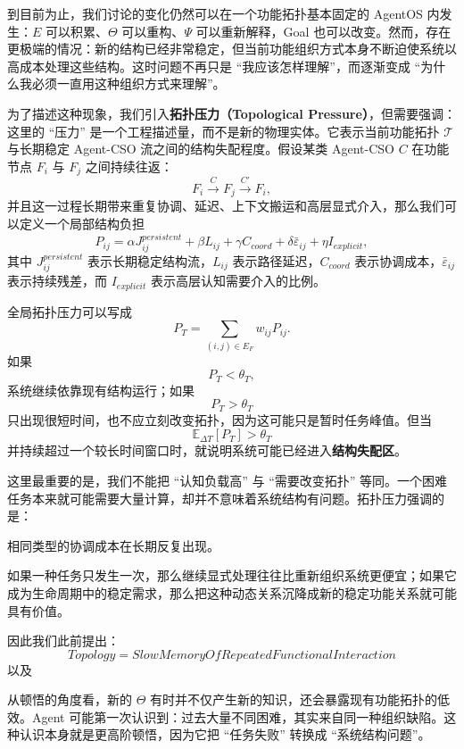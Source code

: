 到目前为止，我们讨论的变化仍然可以在一个功能拓扑基本固定的 AgentOS 内发生：$E$ 可以积累、$\Theta$ 可以重构、$\Psi$ 可以重新解释，Goal 也可以改变。然而，存在更极端的情况：新的结构已经非常稳定，但当前功能组织方式本身不断迫使系统以高成本处理这些结构。这时问题不再只是 ``我应该怎样理解''，而逐渐变成 ``为什么我必须一直用这种组织方式来理解''。

为了描述这种现象，我们引入\textbf{拓扑压力（Topological Pressure）}，但需要强调：这里的 ``压力'' 是一个工程描述量，而不是新的物理实体。它表示当前功能拓扑 $\mathcal T$ 与长期稳定 Agent-CSO 流之间的结构失配程度。假设某类 Agent-CSO $C$ 在功能节点 $F_i$ 与 $F_j$ 之间持续往返：
\[
F_i
\xrightarrow{C}
F_j
\xrightarrow{C'}
F_i,
\]
并且这一过程长期带来重复协调、延迟、上下文搬运和高层显式介入，那么我们可以定义一个局部结构负担
\[
P_{ij}
=
\alpha J_{ij}^{persistent}
+
\beta L_{ij}
+
\gamma C_{coord}
+
\delta \bar{\varepsilon}_{ij}
+
\eta I_{explicit},
\]
其中 $J_{ij}^{persistent}$ 表示长期稳定结构流，$L_{ij}$ 表示路径延迟，$C_{coord}$ 表示协调成本，$\bar{\varepsilon}_{ij}$ 表示持续残差，而 $I_{explicit}$ 表示高层认知需要介入的比例。

全局拓扑压力可以写成
\[
P_T
=
\sum_{(i,j)\in E_F}
w_{ij}P_{ij}.
\]
如果
\[
P_T<\theta_T,
\]
系统继续依靠现有结构运行；如果
\[
P_T>\theta_T
\]
只出现很短时间，也不应立刻改变拓扑，因为这可能只是暂时任务峰值。但当
\[
\mathbb E_{\Delta T}[P_T]
>
\theta_T
\]
并持续超过一个较长时间窗口时，就说明系统可能已经进入\textbf{结构失配区}。

这里最重要的是，我们不能把 ``认知负载高'' 与 ``需要改变拓扑'' 等同。一个困难任务本来就可能需要大量计算，却并不意味着系统结构有问题。拓扑压力强调的是：
\begin{statementbox}
相同类型的协调成本在长期反复出现。
\end{statementbox}
如果一种任务只发生一次，那么继续显式处理往往比重新组织系统更便宜；如果它成为生命周期中的稳定需求，那么把这种动态关系沉降成新的稳定功能关系就可能具有价值。

因此我们此前提出：
\[
\boxed{
Topology
=
SlowMemoryOfRepeatedFunctionalInteraction
}
\]
以及
\begin{statementbox}
\centering
{}
\end{statementbox}
从顿悟的角度看，新的 $\Theta$ 有时并不仅产生新的知识，还会暴露现有功能拓扑的低效。Agent 可能第一次认识到：过去大量不同困难，其实来自同一种组织缺陷。这种认识本身就是更高阶顿悟，因为它把 ``任务失败'' 转换成 ``系统结构问题''。

